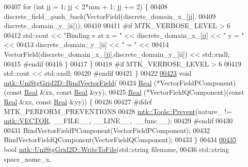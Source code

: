 \begin{DoxyCode}
00407     \textcolor{keywordflow}{for} (\textcolor{keywordtype}{int} jj = 1; jj < 2*mm + 1; jj += 2) \{
00408       discrete\_field\_.push\_back(VectorField(discrete\_domain\_x\_[jj],
00409                                             discrete\_domain\_y\_[ii]));
00410 
00411 \textcolor{preprocessor}{      #if MTK\_VERBOSE\_LEVEL > 6}
00412       std::cout << \textcolor{stringliteral}{"Binding v at x = "} << discrete\_domain\_x\_[jj] << \textcolor{stringliteral}{" y = "} <<
00413         discrete\_domain\_y\_[ii] << \textcolor{stringliteral}{" = "} <<
00414         VectorField(discrete\_domain\_x\_[jj],discrete\_domain\_y\_[ii]) << std::endl;
00415 \textcolor{preprocessor}{      #endif}
00416     \}
00417   \}
00418 \textcolor{preprocessor}{  #if MTK\_VERBOSE\_LEVEL > 6}
00419   std::cout << std::endl;
00420 \textcolor{preprocessor}{  #endif}
00421 \}
00422 
\hypertarget{mtk__uni__stg__grid__2d_8cc_source_l00423}{}\hyperlink{classmtk_1_1UniStgGrid2D_ae274b24672e9bd6075bf38b015bd9083}{00423} \textcolor{keywordtype}{void} \hyperlink{classmtk_1_1UniStgGrid2D_ae274b24672e9bd6075bf38b015bd9083}{mtk::UniStgGrid2D::BindVectorField}(
00424   \hyperlink{group__c01-roots_gac080bbbf5cbb5502c9f00405f894857d}{Real} (*VectorFieldPComponent)(\textcolor{keyword}{const} \hyperlink{group__c01-roots_gac080bbbf5cbb5502c9f00405f894857d}{Real} &xx, \textcolor{keyword}{const} \hyperlink{group__c01-roots_gac080bbbf5cbb5502c9f00405f894857d}{Real} &yy),
00425   \hyperlink{group__c01-roots_gac080bbbf5cbb5502c9f00405f894857d}{Real} (*VectorFieldQComponent)(\textcolor{keyword}{const} \hyperlink{group__c01-roots_gac080bbbf5cbb5502c9f00405f894857d}{Real} &xx, \textcolor{keyword}{const} \hyperlink{group__c01-roots_gac080bbbf5cbb5502c9f00405f894857d}{Real} &yy)) \{
00426 
00427 \textcolor{preprocessor}{  #ifdef MTK\_PERFORM\_PREVENTIONS}
00428   \hyperlink{classmtk_1_1Tools_a332324c6f25e66be9dff48c5987a3b9f}{mtk::Tools::Prevent}(nature\_ != \hyperlink{namespacemtk_ga4c54f2a329cfb4e56213b02a259d19e2a3d8cb27a993651a74d67fb8c98ae91b2}{mtk::VECTOR}, \_\_FILE\_\_, \_\_LINE\_\_, \_\_func\_\_);
00429 \textcolor{preprocessor}{  #endif}
00430 
00431   BindVectorFieldPComponent(VectorFieldPComponent);
00432   BindVectorFieldQComponent(VectorFieldQComponent);
00433 \}
00434 
\hypertarget{mtk__uni__stg__grid__2d_8cc_source_l00435}{}\hyperlink{classmtk_1_1UniStgGrid2D_a1787a79e4bcee6b89c681dc7e5e2d7bc}{00435} \textcolor{keywordtype}{bool} \hyperlink{classmtk_1_1UniStgGrid2D_a1787a79e4bcee6b89c681dc7e5e2d7bc}{mtk::UniStgGrid2D::WriteToFile}(std::string filename,
00436                                     std::string space\_name\_x,

\end{DoxyCode}
